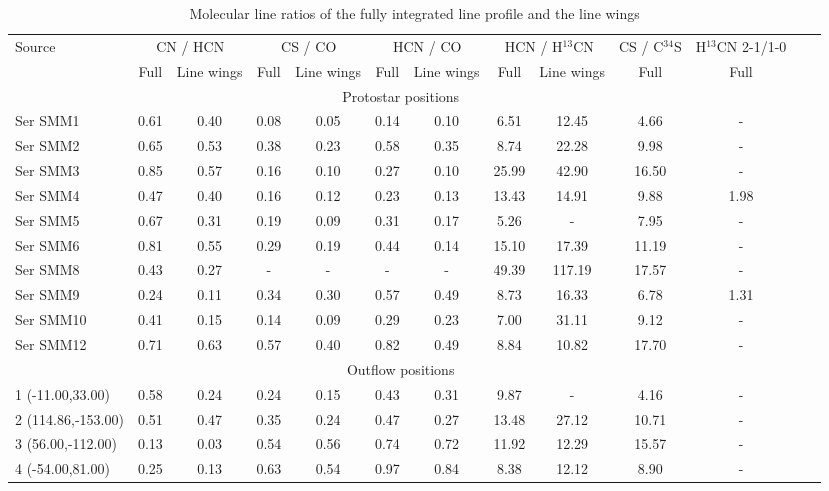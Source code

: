 \documentclass{aa}
\begin{document}
\begin{table*} \caption{Molecular line ratios of the fully integrated line profile and the line wings}             %
\small
\label{table:CN/HCN}
\centering     
   \begin{tabular}{l c c c c c c c c c c c c } 
   \hline\hline 
Source & \multicolumn{2}{c}{CN / HCN} & \multicolumn{2}{c}{CS / CO} & \multicolumn{2}{c}{HCN / CO} & \multicolumn{2}{c}{HCN / H$^{13}$CN} & CS / C$^{34}$S & H$^{13}$CN 2-1/1-0\\
~ & Full & Line wings & Full & Line wings & Full & Line wings & Full & Line wings & Full & Full \\
\hline 
\multicolumn{11}{c}{Protostar positions} \\
\hline 
Ser SMM1 & 0.61 & 0.40 & 0.08 & 0.05 & 0.14 & 0.10 & 6.51 & 12.45 & 4.66 & -    \\
Ser SMM2 & 0.65 & 0.53 & 0.38 & 0.23 & 0.58 & 0.35 & 8.74 & 22.28 & 9.98 &   - \\
Ser SMM3 & 0.85 & 0.57 & 0.16 & 0.10 & 0.27 & 0.10 & 25.99 & 42.90 & 16.50 &  -  \\
Ser SMM4 & 0.47 & 0.40 & 0.16 & 0.12 & 0.23 & 0.13 & 13.43 & 14.91 & 9.88 & 1.98  \\
Ser SMM5 & 0.67 & 0.31 & 0.19 & 0.09 & 0.31 & 0.17 & 5.26 & - & 7.95 & -  \\
Ser SMM6 & 0.81 & 0.55 & 0.29 & 0.19 & 0.44 & 0.14 & 15.10 & 17.39 & 11.19 & -  \\
Ser SMM8 & 0.43 & 0.27 & -  & - & - & - & 49.39 & 117.19 & 17.57 &  - \\
Ser SMM9 & 0.24 & 0.11 & 0.34 & 0.30 & 0.57 & 0.49 & 8.73 & 16.33 & 6.78 & 1.31  \\
Ser SMM10 & 0.41 & 0.15 & 0.14 & 0.09 & 0.29 & 0.23 & 7.00 & 31.11 & 9.12 &  - \\
Ser SMM12 & 0.71 & 0.63 & 0.57 & 0.40 & 0.82 & 0.49 & 8.84 & 10.82 & 17.70 &  - \\
\hline 
\multicolumn{11}{c}{Outflow positions} \\
\hline 
1 (-11.00,33.00) & 0.58 & 0.24 & 0.24 & 0.15 & 0.43 & 0.31 & 9.87 & - & 4.16 & -  \\
2 (114.86,-153.00) & 0.51 & 0.47 & 0.35 & 0.24 & 0.47 & 0.27 & 13.48 & 27.12 & 10.71 & -  \\
3 (56.00,-112.00) & 0.13 & 0.03 & 0.54 & 0.56 & 0.74 & 0.72 & 11.92 & 12.29 & 15.57 & -  \\
4 (-54.00,81.00) & 0.25 & 0.13 & 0.63 & 0.54 & 0.97 & 0.84 & 8.38 & 12.12 & 8.90 &  - \\

\end{tabular}
\end{table*}
\end{document}
